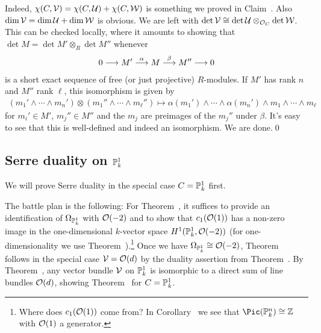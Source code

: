 \documentclass[a4paper,parskip=half,numbers=enddot, DIV=12]{scrreprt}
\begin{document}
Indeed, $\chi(C,\mathcal{V})=\chi(C,\mathcal{U})+\chi(C,\mathcal{W})$ is something we proved in Claim~. Also $\dim\mathcal{V}=\dim \mathcal{U}+\dim\mathcal{W}$ is obvious. We are left with $\operatorname{det}\mathcal{V}\cong \operatorname{det}\mathcal{U}\otimes_{\mathcal{O}_C}\operatorname{det}\mathcal{W}$. This can be checked locally, where it amounts to showing that $\det M=\det M'\otimes_R\det M''$ whenever 
\begin{align*}
	0\morphism M'\morphism[\alpha] M\morphism[\beta] M''\morphism 0
\end{align*}
is a short exact sequence of free (or just projective) $R$-modules. If $M'$ has rank $n$ and $M''$ rank $\ell$, this isomorphism is given by
\begin{align*}
(m_1'\wedge\cdots \wedge m_n')\otimes (m_1''\wedge\cdots\wedge m_\ell'')\longmapsto \alpha(m_1')\wedge\cdots\wedge\alpha(m_n')\wedge m_1\wedge\cdots \wedge m_\ell
\end{align*}
for $m_i'\in M'$, $m_j''\in M''$ and the $m_j$ are preimages of the $m_j''$ under $\beta$. It's easy to see that this is well-defined and indeed an isomorphism. We are done.\qed

\subsection{Serre duality on \texorpdfstring{$\mathbb{P}_k^1$}{P}}
We will prove Serre duality in the special case $C=\mathbb{P}_k^1$ first.

The battle plan is the following: For Theorem~, it suffices to provide an identification of $\Omega_{\mathbb{P}_k^1}$ with $\mathcal{O}(-2)$ and to show that $c_1(\mathcal{O}(1))$ has a non-zero image in the one-dimensional $k$-vector space $H^1(\mathbb{P}_k^1,\mathcal{O}(-2))$ (for one-dimensionality we use Theorem~).\footnote{Where does $c_1(\mathcal{O}(1))$ come from? In Corollary~ we see that $\Pic(\IP_k^n)\cong \IZ$ with $\mathcal{O}(1)$ a generator.} Once we have $\Omega_{\mathbb{P}_k^1}\cong\mathcal{O}(-2)$, Theorem~ follows in the special case $\mathcal{V}=\mathcal{O}(d)$ by the duality assertion from Theorem~. By Theorem~, any vector bundle $\mathcal{V}$ on $\mathbb{P}_k^1$ is isomorphic to a direct sum of line bundles $\mathcal{O}(d)$, showing Theorem~ for $C=\mathbb{P}_k^1$.
\end{document}
